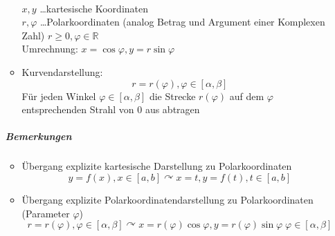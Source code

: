 \documentclass[a4paper]{scrartcl}
\begin{document}
\begin{enumerate}
\begin{itemize}
\begin{tikzpicture}
\end{tikzpicture}\\
$x,y$ \dots kartesische Koordinaten\\
$r,\varphi$ \dots Polarkoordinaten (analog Betrag und Argument einer Komplexen Zahl) $r\geq 0, \varphi \in \mathbb{R}$\\
Umrechnung: $x = \cos{\varphi}, y = r\sin{\varphi}$
\item Kurvendarstellung: \[r=r(\varphi), \varphi \in [\alpha,\beta]\]
Für jeden Winkel $\varphi \in [\alpha,\beta]$ die Strecke $r(\varphi)$ auf dem $\varphi$ entsprechenden Strahl von $0$ aus abtragen

\end{itemize}
\subparagraph{Bemerkungen}
\begin{itemize}
\item Übergang explizite kartesische Darstellung zu Polarkoordinaten
\[y=f(x), x \in [a,b] \curvearrowright x=t, y=f(t), t \in [a,b] \]
\item Übergang explizite Polarkoordinatendarstellung zu Polarkoordinaten (Parameter $\varphi$)
\[r=r(\varphi),\varphi \in [\alpha,\beta] \curvearrowright x=r(\varphi)\cos{\varphi}, y= r(\varphi) \sin{\varphi}\; \varphi \in [\alpha,\beta]\]

\end{itemize}

\end{enumerate}
\end{document}
